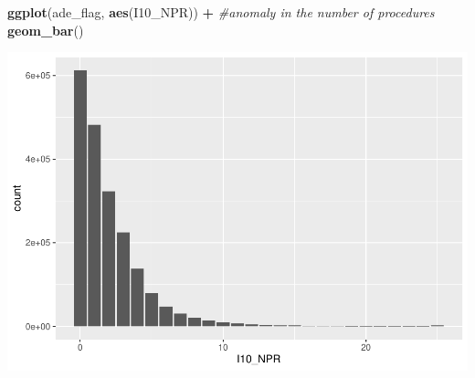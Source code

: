 \documentclass[preprint, 3p,
authoryear]{elsarticle} %
\newenvironment{Shaded}{\begin{snugshade}}{\end{snugshade}}
\newcommand{\CommentTok}[1]{\textcolor[rgb]{0.56,0.35,0.01}{\textit{#1}}}
\newcommand{\KeywordTok}[1]{\textcolor[rgb]{0.13,0.29,0.53}{\textbf{#1}}}
\newcommand{\NormalTok}[1]{#1}
\newcommand{\OperatorTok}[1]{\textcolor[rgb]{0.81,0.36,0.00}{\textbf{#1}}}
\newcommand{\StringTok}[1]{\textcolor[rgb]{0.31,0.60,0.02}{#1}}
\begin{document}
\begin{Shaded}
\begin{Highlighting}[]
\KeywordTok{ggplot}\NormalTok{(ade\_flag, }\KeywordTok{aes}\NormalTok{(I10\_NPR)) }\OperatorTok{+}\StringTok{ }\CommentTok{\#anomaly in the number of procedures}
\StringTok{  }\KeywordTok{geom\_bar}\NormalTok{()}
\end{Highlighting}
\end{Shaded}

\includegraphics{final-project-paper_files/figure-latex/n-procedures-1.pdf}
\end{document}
